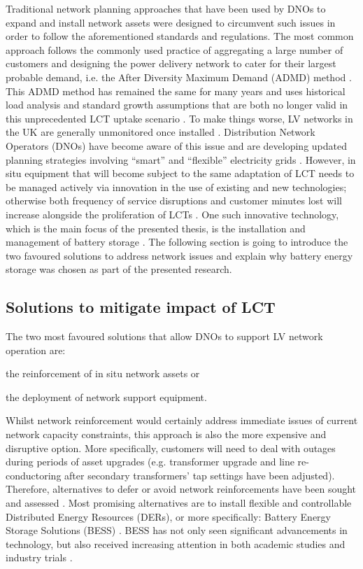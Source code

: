 Traditional network planning approaches that have been used by DNOs to expand and install network assets were designed to circumvent such issues in order to follow the aforementioned standards and regulations.
The most common approach follows the commonly used practice of aggregating a large number of customers and designing the power delivery network to cater for their largest probable demand, i.e. the After Diversity Maximum Demand (ADMD) method \cite{Richardson2010a}.
This ADMD method has remained the same for many years and uses historical load analysis and standard growth assumptions that are both no longer valid in this unprecedented LCT uptake scenario \cite{Yunusov2016}.
To make things worse, LV networks in the UK are generally unmonitored once installed \cite{Yunusov2016}.
Distribution Network Operators (DNOs) have become aware of this issue and are developing updated planning strategies involving ``smart'' and ``flexible'' electricity grids \cite{Fang2012}.
However, in situ equipment that will become subject to the same adaptation of LCT needs to be managed actively via innovation in the use of existing and new technologies; otherwise both frequency of service disruptions and customer minutes lost will increase alongside the proliferation of LCTs \cite{Ault2008a}.
One such innovative technology, which is the main focus of the presented thesis, is the installation and management of battery storage \cite{Chen2009}.
The following section is going to introduce the two favoured solutions to address network issues and explain why battery energy storage was chosen as part of the presented research.


\subsection{Solutions to mitigate impact of LCT}
\label{ch-introduction:subsec:solutions-to-mitigate-impact-of-lct}

The two most favoured solutions that allow DNOs to support LV network operation are:
\begin{enumerate*}
	\item the reinforcement of in situ network assets or
	\item the deployment of network support equipment.
\end{enumerate*}
Whilst network reinforcement would certainly address immediate issues of current network capacity constraints, this approach is also the more expensive and disruptive option.
More specifically, customers will need to deal with outages during periods of asset upgrades (e.g. transformer upgrade and line re-conductoring after secondary transformers' tap settings have been adjusted).
Therefore, alternatives to defer or avoid network reinforcements have been sought and assessed \cite{Harrison2007, Zangs2016a, VanderKlauw2016d, Greenwood2017}.
Most promising alternatives are to install flexible and controllable Distributed Energy Resources (DERs), or more specifically: Battery Energy Storage Solutions (BESS) \cite{Wade2010}.
BESS has not only seen significant advancements in technology, but also received increasing attention in both academic studies and industry trials \cite{Palizban2016}.

